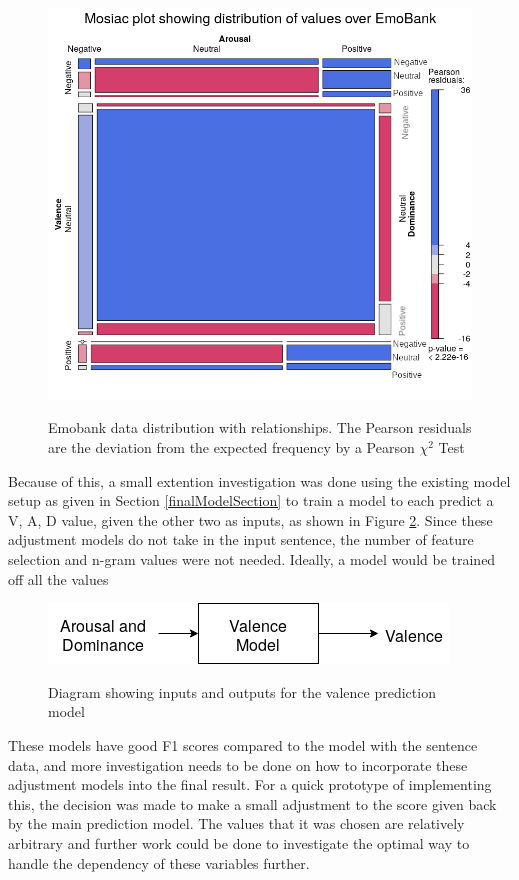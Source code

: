 \begin{figure}[ht]
\centering
\includegraphics[scale=0.7]{graphs/mosaic_new.png}
\label{mosaic:emo}
\caption{Emobank data distribution with relationships. The Pearson residuals are the deviation from the expected frequency by a Pearson $\chi^2$ Test \cite{pearson1900x}}
\end{figure}

Because of this, a small extention investigation was done using the existing model setup as given in Section \ref{finalModelSection} to train a model to each predict a V, A, D value, given the other two as inputs, as shown in Figure \ref{model:adjust}. Since these adjustment models do not take in the input sentence, the number of feature selection and n-gram values were not needed. Ideally, a model would be trained off all the values 

\begin{figure}[ht]
\centering
\includegraphics[scale=0.6]{implementation/adjustModel.png}
\label{model:adjust}
\caption{Diagram showing inputs and outputs for the valence prediction model}
\end{figure}

These models have good F1 scores compared to the model with the sentence data, and more investigation needs to be done on how to incorporate these adjustment models into the final result. For a quick prototype of implementing this, the decision was made to make a small adjustment to the score given back by the main prediction model. The values that it was chosen are relatively arbitrary and further work could be done to investigate the optimal way to handle the dependency of these variables further.


